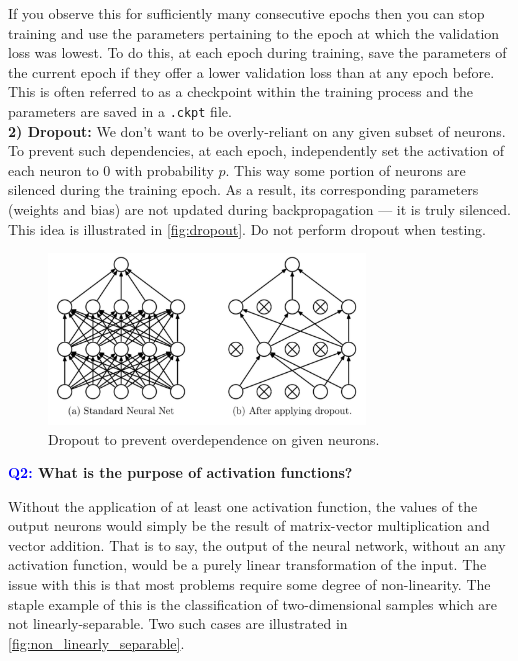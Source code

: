 \documentclass[11pt]{article}
\begin{document}
\noindent If you observe this for sufficiently many consecutive epochs then you can stop training and use the parameters pertaining to the epoch at which the validation loss was lowest. To do this, at each epoch during training, save the parameters of the current epoch if they offer a lower validation loss than at any epoch before. This is often referred to as a checkpoint within the training process and the parameters are saved in a \texttt{.ckpt} file.\\

\noindent\textbf{2) Dropout:} We don't want to be overly-reliant on any given subset of neurons. To prevent such dependencies, at each epoch, independently set the activation of each neuron to 0 with probability $p$. This way some portion of neurons are silenced during the training epoch. As a result, its corresponding parameters (weights and bias) are not updated during backpropagation — it is truly silenced. This idea is illustrated in \autoref{fig:dropout}. Do not perform dropout when testing.

\begin{figure}[ht]
    \centering
    \includegraphics[width=0.75\textwidth]{./figures/neural_nets/REG_dropout.png}
    \caption{Dropout to prevent overdependence on given neurons.}
    \label{fig:dropout}
\end{figure}

\begin{center}
    \textbf{\textcolor{blue}{Q2:} What is the purpose of activation functions?}
\end{center}
Without the application of at least one activation function, the values of the output neurons would simply be the result of matrix-vector multiplication and vector addition. That is to say, the output of the neural network, without an any activation function, would be a purely linear transformation of the input. The issue with this is that most problems require some degree of non-linearity. The staple example of this is the classification of two-dimensional samples which are not linearly-separable. Two such cases are illustrated in \autoref{fig:non_linearly_separable}.
\end{document}
